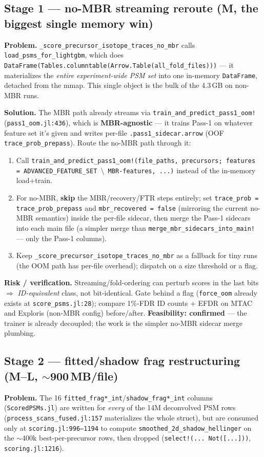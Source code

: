 \documentclass[11pt]{article}
\newcommand{\code}[1]{\texttt{\small #1}}
\begin{document}
\subsection*{Stage 1 --- no-MBR streaming reroute (M, the biggest single memory win)}
\textbf{Problem.} \code{\_score\_precursor\_isotope\_traces\_no\_mbr} calls
\code{load\_psms\_for\_lightgbm}, which does
\code{DataFrame(Tables.columntable(Arrow.Table(all\_fold\_files)))} --- it materializes the
\emph{entire experiment-wide PSM set} into one in-memory \code{DataFrame}, detached from the
mmap. This single object is the bulk of the 4.3\,GB on non-MBR runs.

\textbf{Solution.} The MBR path already streams via \code{train\_and\_predict\_pass1\_oom!}
(\code{pass1\_oom.jl:436}), which is \textbf{MBR-agnostic} --- it trains Pass-1 on whatever
feature set it's given and writes per-file \code{.pass1\_sidecar.arrow} (OOF
\code{trace\_prob\_prepass}). Route the no-MBR path through it:
\begin{enumerate}
  \item Call \code{train\_and\_predict\_pass1\_oom!(file\_paths, precursors; features =
  ADVANCED\_FEATURE\_SET\,$\setminus$\,MBR-features, ...)} instead of the in-memory load+train.
  \item For no-MBR, \textbf{skip} the MBR/recovery/FTR steps entirely; set
  \code{trace\_prob = trace\_prob\_prepass} and \code{mbr\_recovered = false} (mirroring the
  current no-MBR semantics) inside the per-file sidecar, then merge the Pass-1 sidecars into
  each main file (a simpler merge than \code{merge\_mbr\_sidecars\_into\_main!} --- only the
  Pass-1 columns).
  \item Keep \code{\_score\_precursor\_isotope\_traces\_no\_mbr} as a fallback for tiny runs
  (the OOM path has per-file overhead); dispatch on a size threshold or a flag.
\end{enumerate}
\textbf{Risk / verification.} Streaming/fold-ordering can perturb scores in the last bits
$\Rightarrow$ \emph{ID-equivalent} class, not bit-identical. Gate behind a flag
(\code{force\_oom} already exists at \code{score\_psms.jl:28}); compare 1\%-FDR ID counts +
EFDR on MTAC and Exploris (non-MBR config) before/after. \textbf{Feasibility: confirmed} ---
the trainer is already decoupled; the work is the simpler no-MBR sidecar merge plumbing.

\subsection*{Stage 2 --- fitted/shadow frag restructuring (M--L, $\sim$900\,MB/file)}
\textbf{Problem.} The 16 \code{fitted\_frag*\_int}/\code{shadow\_frag*\_int} columns
(\code{ScoredPSMs.jl}) are written for \emph{every} of the 14M deconvolved PSM rows
(\code{process\_scans\_fused.jl:157} materializes the whole struct), but are consumed only at
\code{scoring.jl:996--1194} to compute \code{smoothed\_2d\_shadow\_hellinger} on the $\sim$400k
best-per-precursor rows, then dropped (\code{select!(... Not([...]))}, \code{scoring.jl:1216}).
\end{document}
